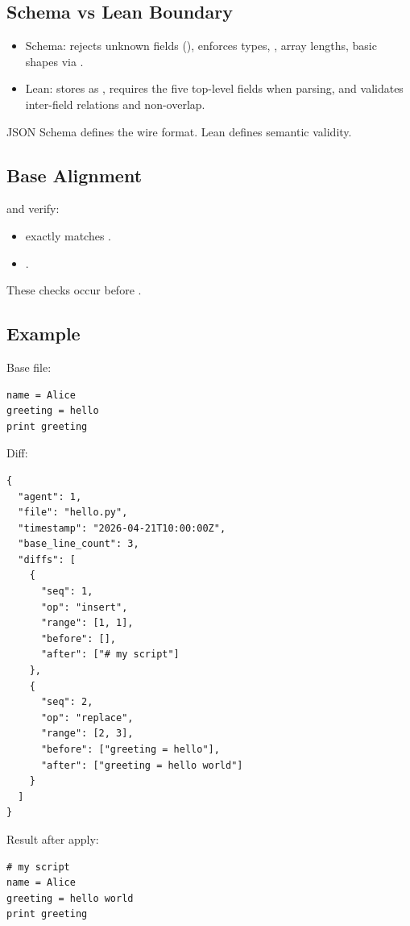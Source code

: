 \subsection{Schema vs Lean Boundary}

\begin{itemize}
  \item Schema: rejects unknown fields (), enforces types, , array lengths, basic shapes via .
  \item Lean: stores  as , requires the five top-level fields when parsing, and validates inter-field relations and non-overlap.
\end{itemize}

JSON Schema defines the wire format. Lean defines semantic validity.

\subsection{Base Alignment}

 and  verify:

\begin{itemize}
  \item {} exactly matches .
  \item {}.
\end{itemize}

These checks occur before .

\subsection{Example}

Base file:
\begin{verbatim}
name = Alice
greeting = hello
print greeting
\end{verbatim}

Diff:
\begin{lstlisting}[style=jsonstyle]
{
  "agent": 1,
  "file": "hello.py",
  "timestamp": "2026-04-21T10:00:00Z",
  "base_line_count": 3,
  "diffs": [
    {
      "seq": 1,
      "op": "insert",
      "range": [1, 1],
      "before": [],
      "after": ["# my script"]
    },
    {
      "seq": 2,
      "op": "replace",
      "range": [2, 3],
      "before": ["greeting = hello"],
      "after": ["greeting = hello world"]
    }
  ]
}
\end{lstlisting}

Result after apply:
\begin{verbatim}
# my script
name = Alice
greeting = hello world
print greeting
\end{verbatim}
